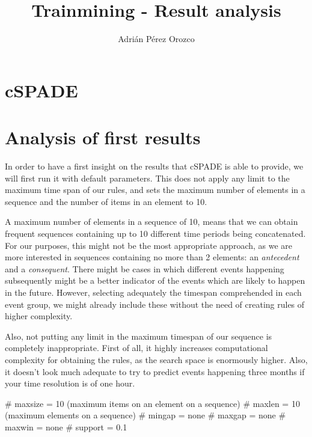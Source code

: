 \documentclass[a4paper,10pt]{article}
\title{Trainmining - Result analysis}
\author{Adrián Pérez Orozco}
\begin{document}
\maketitle

\section{cSPADE}
\section{Analysis of first results}
In order to have a first insight on the results that cSPADE is able to provide, we will first run it with default parameters. This does not apply any limit to the maximum time span of our rules, and sets the maximum number of elements in a sequence and the number of items in an element to 10.

A maximum number of elements in a sequence of 10, means that we can obtain frequent sequences containing up to 10 different time periods being concatenated. For our purposes, this might not be the most appropriate approach, as we are more interested in sequences containing no more than 2 elements: an \emph{antecedent} and a \emph{consequent}. There might be cases in which different events happening subsequently might be a better indicator of the events which are likely to happen in the future. However, selecting adequately the timespan comprehended in each event group, we might already include these without the need of creating rules of higher complexity.

Also, not putting any limit in the maximum timespan of our sequence is completely inappropriate. First of all, it highly increases computational complexity for obtaining the rules, as the search space is enormously higher. Also, it doesn't look much adequate to try to predict events happening three months if your time resolution is of one hour.

# maxsize = 10 (maximum items on an element on a sequence)
# maxlen = 10 (maximum elements on a sequence)
# mingap = none
# maxgap = none
# maxwin = none
# support = 0.1
 
\end{document}
